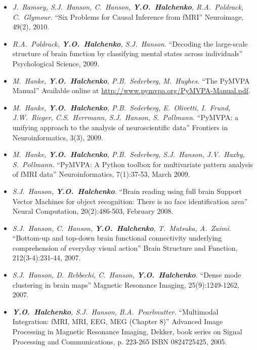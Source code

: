 \documentclass[12pt,overlapped,line]{res}
\newcommand{\mtitle}[1]{``#1''}
\newcommand{\mauthors}[1]{ \textit{#1.}}
\newcommand{\mwhere}[1]{#1.}
\begin{document}
\begin{resume}
\begin{itemize}
 \item
   \mauthors{J.~Ramsey, S.J.~Hanson, C.~Hanson, \textbf{Y.O.~Halchenko},
     R.A.~Poldrack, C.~Glymour}
   \mtitle{Six Problems for Causal Inference from fMRI}
   \mwhere{Neuroimage, 49(2), 2010}

 \item
   \mauthors{R.A.~Poldrack, \textbf{Y.O.~Halchenko}, S.J.~Hanson}
   \mtitle{Decoding the large-scale structure of brain function by
     classifying mental states across individuals}
   \mwhere{Psychological Science, 2009}

  \item
    \mauthors{M.~Hanke, \textbf{Y.O.~Halchenko}, P.B.~Sederberg, M.~Hughes}
    \mtitle{The PyMVPA Manual}
    \mwhere{\newline Available online at \url{http://www.pymvpa.org/PyMVPA-Manual.pdf}}

 \item
   \mauthors{ M.~Hanke, \textbf{Y.O.~Halchenko}, P.B.~Sederberg, E.~Olivetti, I.~Frund, J.W.~Rieger, C.S.~Herrmann, S.J.~Hanson, S.~Pollmann}
    \mtitle{PyMVPA: a unifying approach to the analysis of neuroscientific data}
    \mwhere{Frontiers in Neuroinformatics, 3(3), 2009}

  \item
    \mauthors{M.~Hanke, \textbf{Y.O.~Halchenko}, P.B.~Sederberg, S.J.~Hanson, J.V.~Haxby, S.~Pollmann}
    \mtitle{PyMVPA: A Python toolbox for multivariate pattern analysis of fMRI data}
    \mwhere{Neuroinformatics, 7(1):37-53, March 2009}

  \item
    \mauthors{S.J.~Hanson, \textbf{Y.O.~Halchenko}}
    \mtitle{Brain reading using full brain Support Vector Machines for
      object recognition: There is no face identification area}
    \mwhere{Neural Computation, 20(2):486-503, February 2008}

  \item
    \mauthors{S.J.~Hanson, C.~Hanson, \textbf{Y.O.~Halchenko}, T.~Matsuka, A.~Zaimi}
    \mtitle{Bottom-up and top-down brain functional connectivity underlying comprehension of everyday visual action}
    \mwhere{Brain Structure and Function, 212(3-4):231-44, 2007}

  \item
    \mauthors{S.J.~Hanson, D.~Rebbechi, C.~Hanson, \textbf{Y.O.~Halchenko}}
    \mtitle{Dense mode clustering in brain maps}
    \mwhere{Magnetic Resonance Imaging, 25(9):1249-1262, 2007}

  \item
    \mauthors{\textbf{Y.O.~Halchenko}, S.J.~Hanson, B.A.~Pearlmutter}
    \mtitle{Multimodal Integration: fMRI, MRI, EEG, MEG (Chapter 8)}
    \mwhere{Advanced Image Processing in Magnetic Resonance Imaging,
      Dekker, book series on Signal Processing and Communications, p. 223-265
      ISBN 0824725425, 2005}


\end{itemize}
\end{resume}
\end{document}
